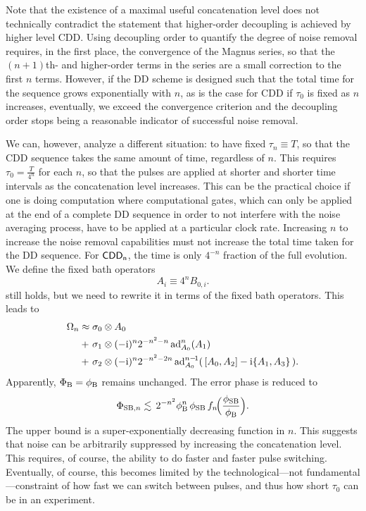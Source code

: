 \documentclass[b5paper,11pt]{article}
\newcommand{\CDDn}{\textsf{CDD\textsubscript{n}}}
\begin{document}
Note that the existence of a maximal useful concatenation level does not technically contradict the statement that 
higher-order decoupling is achieved by higher level CDD. Using decoupling order to quantify the degree of noise removal requires, in the first place, the convergence of the Magnus series, so that the $(n+1)$th- and higher-order terms in the series are a small correction to the first $n$ terms. However, if the DD scheme is designed such that the total time for the sequence grows exponentially with $n$, as is the case for CDD if $\tau_0$ is fixed as $n$ increases, eventually, we exceed the convergence criterion and the decoupling order stops being a reasonable indicator of successful noise removal. 

We can, however, analyze a different situation: to have fixed $\tau_n\equiv T$, so that the CDD sequence takes the same amount of time, regardless of $n$. This requires $\tau_0=\frac{T}{4^n}$ for each $n$, so that the pulses are applied at shorter and shorter time intervals as the concatenation level increases. This can be the practical choice if one is doing computation where computational gates, which can only be applied at the end of a complete DD sequence in order to not interfere with the noise averaging process, have to be applied at a particular clock rate. Increasing $n$ to increase the noise removal capabilities must not increase the total time taken for the DD sequence.
For $\CDDn$, the time is only $4^{-n}$ fraction of the full evolution. We define the fixed bath operators 
\begin{equation}
 A_{i}\equiv 4^{n} B_{0,i}.
\end{equation}
 still holds, but we need to 
rewrite it in terms of the fixed bath operators. This leads to 
\begin{align}\label{eq:cdd-generator-est2}
\Omega_{n} 
\approx {} & \sigma_0 \otimes A_0 \notag \\
+\ & \sigma_1 \otimes (-\mathrm{i})^{n} 2^{-n^2-n} \operatorname{ad}_{A_0}^{n}(A_1)\\ 
+\ & \sigma_2 \otimes (-\mathrm{i})^{n} 2^{-n^2-2n} \operatorname{ad}_{A_0}^{n-\!1}( \,[A_0,A_2] - \mathrm{i} \{A_1,A_3\} \,). \notag
\end{align} 
Apparently, $\Phi_{\mathrm{B}} = \phi_{\mathrm{B}}$ remains unchanged.
The error phase is reduced to
\begin{equation}
 \Phi_{\mathrm{SB},n} \lesssim \,
2^{-n^2} \phi_{\mathrm{B}}^{n}\,\phi_{\mathrm{SB}} \,f_n\!\Bigl(\frac{\phi_{\mathrm{SB}}}{\phi_{\mathrm{B}}}\Bigr).
\end{equation}
The upper bound is a super-exponentially decreasing function in $n$. This suggests that noise can be arbitrarily suppressed by increasing the concatenation level.  This requires, of course, the ability to do faster and faster pulse switching.
Eventually, of course, this becomes limited by the technological---not fundamental---constraint of how fast we can switch between pulses, and thus how short $\tau_0$ can be in an experiment.
\end{document}
